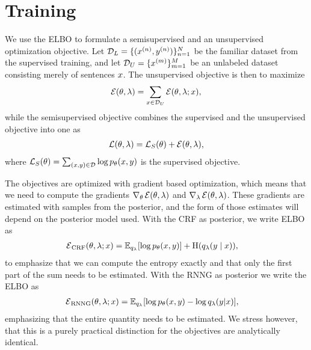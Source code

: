 \section{Training}
  We use the ELBO to formulate a semisupervised and an unsupervised optimization objective. Let $\mathcal{D}_L = \{ (x^{(n)}, y^{(n)})\}_{n=1}^N$ be the familiar dataset from the supervised training, and let $\mathcal{D}_U = \{ x^{(m)} \}_{m=1}^M$ be an unlabeled dataset consisting merely of sentences $x$. The unsupervised objective is then to maximize
  \begin{align}
    \operatorname{\mathcal{E}}(\theta, \lambda) = \sum_{ x \in \mathcal{D}_U } \operatorname{\mathcal{E}}(\theta, \lambda; x),
  \end{align}
  while the semisupervised objective combines the supervised and the unsupervised objective into one as
  \begin{align*}
    \operatorname{\mathcal{L}}(\theta, \lambda) = \operatorname{\mathcal{L}}_{S}(\theta) + \operatorname{\mathcal{E}}(\theta, \lambda),
  \end{align*}
  where $\operatorname{\mathcal{L}}_{S}(\theta) = \sum_{ (x, y) \in \mathcal{D} } \log p_{\theta}(x, y)$ is the supervised objective.

  The objectives are optimized with gradient based optimization, which means that we need to compute the gradients $\nabla_{\theta} \operatorname{\mathcal{E}}(\theta, \lambda)$ and $\nabla_{\lambda} \operatorname{\mathcal{E}}(\theta, \lambda)$. These gradients are estimated with samples from the posterior, and the form of those estimates will depend on the posterior model used. With the CRF as posterior, we write ELBO as
  \begin{align}
    \operatorname{\mathcal{E}}_{\text{CRF}}(\theta, \lambda; x)
      &= \operatorname{\mathbb{E}}_{q_{\lambda}} [ \log p_{\theta}( x, y ) ] + \operatorname{H}(q_{\lambda}(y \mid x)),
  \end{align}
  to emphasize that we can compute the entropy exactly and that only the first part of the sum needs to be estimated. With the RNNG as posterior we write the ELBO as
  \begin{align}
    \operatorname{\mathcal{E}}_{\text{RNNG}}(\theta, \lambda; x)
      &= \operatorname{\mathbb{E}}_{q_{\lambda}} [ \log p_{\theta}( x, y ) - \log q_{\lambda}(y | x) ],
  \end{align}
  emphasizing that the entire quantity needs to be estimated. We stress however, that this is a purely practical distinction for the objectives are analytically identical.

